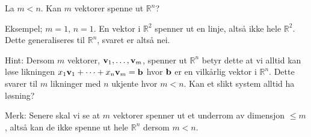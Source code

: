 \begin{oppgave}
	La $m<n$. Kan $m$ vektorer spenne ut $\mathbb{R}^n$? 
\end{oppgave}

\begin{losning}
Eksempel; $m=1$, $n=1$. En vektor i $\mathbb{R}^2$ spenner ut en linje, altså ikke hele $\mathbb{R}^2$. Dette generaliseres til $\mathbb{R}^n$, svaret er altså nei.

\noindent
Hint: Dersom $m$ vektorer, $\mathbf{v}_1,\dots,\mathbf{v}_m$, spenner ut $\mathbb{R}^n$ betyr dette at vi alltid kan løse likningen $x_1\mathbf{v}_1+\dots+x_n\mathbf{v}_m=\mathbf{b}$ hvor $\mathbf{b}$ er en vilkårlig vektor i $\mathbb{R}^n$. Dette svarer til $m$ likninger med $n$ ukjente hvor $m<n$. Kan et slikt system alltid ha løsning?

\noindent
Merk: Senere skal vi se at $m$ vektorer spenner ut et underrom av dimensjon $\leq m$, altså kan de ikke spenne ut hele $\mathbb{R}^n$ dersom $m<n$.
\end{losning}




